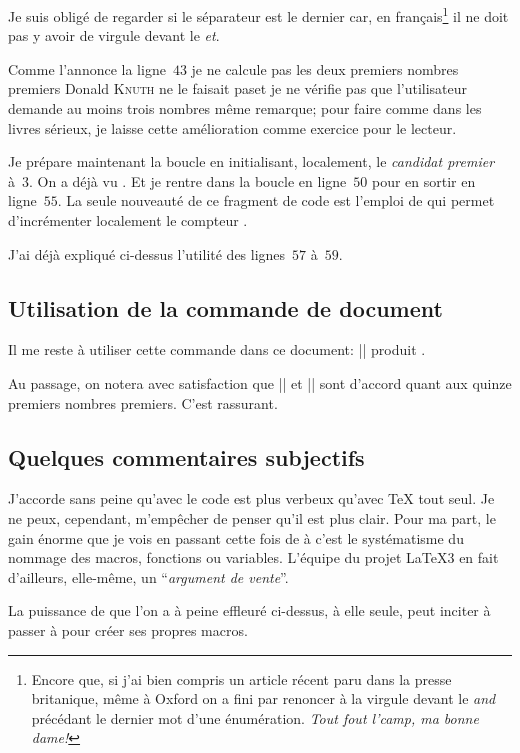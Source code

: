 Je suis obligé de regarder si le séparateur est le dernier car, en
français\footnote{Encore que, si j'ai bien compris un article récent
  paru dans la presse britanique, même à Oxford on a fini par
  renoncer à la virgule devant le \emph{and} précédant le dernier mot
  d'une énumération. \textsl{Tout fout l'camp, ma bonne dame!}} il ne
doit pas y avoir de virgule devant le \emph{et}.

Comme l'annonce la ligne~\(43\) je ne calcule pas les deux premiers
nombres premiers \TO Donald \textsc{Knuth} ne le faisait pas\TF et je
ne vérifie pas que l'utilisateur demande au moins trois nombres \TO
même remarque\TF; pour faire comme dans les livres sérieux, je laisse
cette amélioration comme exercice pour le lecteur.

Je prépare maintenant la boucle en initialisant, localement, le
\emph{candidat premier} à~\(3\). On a déjà vu .
Et je rentre dans la boucle en ligne~\(50\) pour en sortir en
ligne~\(55\). La seule nouveauté de ce fragment de code est l'emploi
de  qui permet d'incrémenter localement le compteur
.

J'ai déjà expliqué ci-dessus l'utilité des lignes~\(57\) à~\(59\).

\subsection{Utilisation de la commande de document}
\label{sec:utilisation}

Il me reste à utiliser cette commande dans ce document:
|| produit \og {}\fg.

Au passage, on notera avec satisfaction que |\primes| et
|\ListePremiers| sont d'accord quant aux quinze premiers nombres
premiers. C'est rassurant.

\subsection{Quelques commentaires subjectifs}
\label{sec:commentairessubjectifs}

J'accorde sans peine qu'avec \Expliii le code est plus verbeux qu'avec
\TeX{} tout seul. Je ne peux, cependant, m'empêcher de penser qu'il
est plus clair. Pour ma part, le gain énorme que je vois en passant
cette fois de \LaTeXe{} à \Expliii{} c'est le systématisme du nommage
des macros, \glspl{fonction} ou \glspl{variable}. L'équipe du projet
\LaTeX3 en fait d'ailleurs, elle-même, un ``\emph{argument de
  vente}''.

La puissance de  \TO que l'on a à peine
effleuré ci-dessus\TF, à elle seule, peut inciter à passer à
\Expliii{} pour créer ses propres macros.

